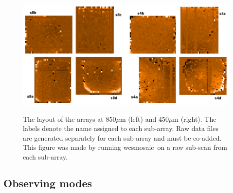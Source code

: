 \documentclass[twoside,11pt]{article}
\newcommand{\xref}[3]{#1}
\newcommand{\xlabel}[1]{}
\renewcommand{\_}{\texttt{\symbol{95}}}
\newcommand{\task}[1]{\textsf{#1}}
\newcommand{\wcsmosaic}{\xref{\task{wcsmosaic}}{sun95}{WCSMOSAIC}}
\begin{document}
\begin{figure}[t!]
\begin{center}
\includegraphics[width=0.8\linewidth]{sc21_arrays}
\label{fig:arrays}
\caption[The physical layout of the arrays at each wavelength]{
  \small The layout of the arrays at 850$\mu$m (left) and
  450$\mu$m (right). The labels denote the name assigned to each
  sub-array. Raw data files are generated separately for each sub-array
  and must be co-added. This figure was made by running
 \wcsmosaic\ on a raw sub-scan from each sub-array.
}
\end{center}
\end{figure}

\subsection{\xlabel{obs_modes}Observing modes}
\label{sec:mmodes}
\end{document}
